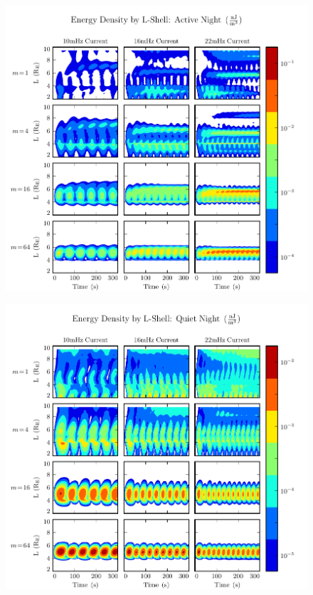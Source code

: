 \begin{figure}[H]
    \centering
    \includegraphics[width=\textwidth]{figures/ulayers_J_3.pdf}
    \caption[Energy Density by L-Shell: Active Night]{}
    \label{fig_ulayers_J_3}
\end{figure}

\begin{figure}[H]
    \centering
    \includegraphics[width=\textwidth]{figures/ulayers_J_4.pdf}
    \caption[Energy Density by L-Shell: Quiet Night]{}
    \label{fig_ulayers_J_4}
\end{figure}







